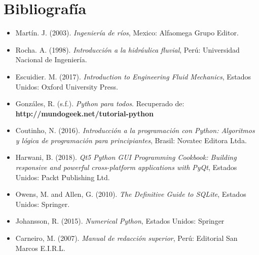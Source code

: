 \documentclass[12pt,a4paper]{report}
\begin{document}
\section{Bibliografía}
\begin{itemize}
	\item Martín. J. (2003). \textit{Ingeniería de ríos}, Mexico: Alfaomega Grupo Editor.
	\item Rocha. A. (1998). \textit{Introducción a la hidráulica fluvial}, Perú: Universidad Nacional de Ingeniería.
	\item Escuidier. M. (2017). \textit{Introduction to Engineering Fluid Mechanics}, Estados Unidos: Oxford University Press.
	\item Gonzáles, R. (s.f.). \textit{Python para todos}. Recuperado de: \textbf{http://mundogeek.net/tutorial-python}
	\item Coutinho, N. (2016). \textit{Introducción a la programación con Python: Algoritmos y lógica de programación para principiantes}, Brasil: Novatec Editora Ltda.
	\item Harwani, B. (2018). \textit{Qt5 Python GUI Programming Cookbook: Building responsive and powerful cross-platform applications with PyQt}, Estados Unidos: Packt Publishing Ltd.
	\item Owens, M. and Allen, G. (2010). \textit{The Definitive Guide to SQLite}, Estados Unidos: Springer.
	\item Johansson, R. (2015). \textit{Numerical Python}, Estados Unidos: Springer
	\item Carneiro, M. (2007). \textit{Manual de redacción superior}, Perú: Editorial San Marcos E.I.R.L.
\end{itemize}
\end{document}
